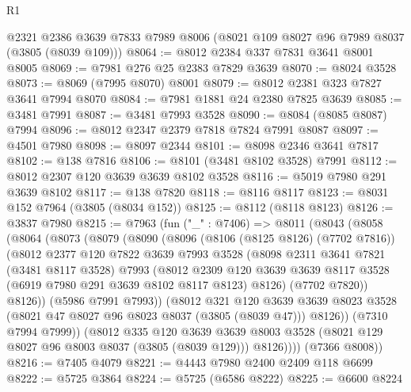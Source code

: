\begin{lexlean}{R1}
\begin{coremodule}
    @2321
    @2386
    @3639
    @7833
    @7989
    @8006
    (@8021 @109 @8027 @96 @7989 @8037 (@3805 (@8039 @109)))
@8064 := @8012 @2384 @337 @7831 @3641 @8001 @8005
@8069 := @7981 @276 @25 @2383 @7829 @3639
@8070 := @8024 @3528
@8073 := @8069 (@7995 @8070) @8001
@8079 := @8012 @2381 @323 @7827 @3641 @7994 @8070
@8084 := @7981 @1881 @24 @2380 @7825 @3639
@8085 := @3481 @7991
@8087 := @3481 @7993 @3528
@8090 := @8084 (@8085 @8087) @7994
@8096 := @8012 @2347 @2379 @7818 @7824 @7991 @8087
@8097 := @4501 @7980
@8098 := @8097 @2344
@8101 := @8098 @2346 @3641 @7817
@8102 := @138 @7816
@8106 := @8101 (@3481 @8102 @3528) @7991
@8112 := @8012 @2307 @120 @3639 @3639 @8102 @3528
@8116 := @5019 @7980 @291 @3639 @8102
@8117 := @138 @7820
@8118 := @8116 @8117
@8123 := @8031 @152 @7964 (@3805 (@8034 @152))
@8125 := @8112 (@8118 @8123)
@8126 := @3837 @7980
@8215 := @7963
    (fun ("_" : @7406) =>
    @8011
      (@8043
        (@8058
          (@8064
            (@8073
              (@8079
                (@8090
                  (@8096
                    (@8106 (@8125 @8126) (@7702 @7816))
                    (@8012
                      @2377
                      @120
                      @7822
                      @3639
                      @7993
                      @3528
                      (@8098
                        @2311
                        @3641
                        @7821
                        (@3481 @8117 @3528)
                        @7993
                        (@8012
                          @2309
                          @120
                          @3639
                          @3639
                          @8117
                          @3528
                          (@6919 @7980 @291 @3639 @8102 @8117 @8123)
                          @8126)
                        (@7702 @7820))
                      @8126))
                  (@5986 @7991 @7993))
                (@8012
                  @321
                  @120
                  @3639
                  @3639
                  @8023
                  @3528
                  (@8021 @47 @8027 @96 @8023 @8037 (@3805 (@8039 @47)))
                  @8126))
              (@7310 @7994 @7999))
            (@8012
              @335
              @120
              @3639
              @3639
              @8003
              @3528
              (@8021 @129 @8027 @96 @8003 @8037 (@3805 (@8039 @129)))
              @8126))))
      (@7366 @8008))
@8216 := @7405 @4079
@8221 := @4443 @7980 @2400 @2409 @118 @6699
@8222 := @5725 @3864
@8224 := @5725 (@6586 @8222)
@8225 := @6600 @8224

\end{coremodule}
\end{lexlean}
